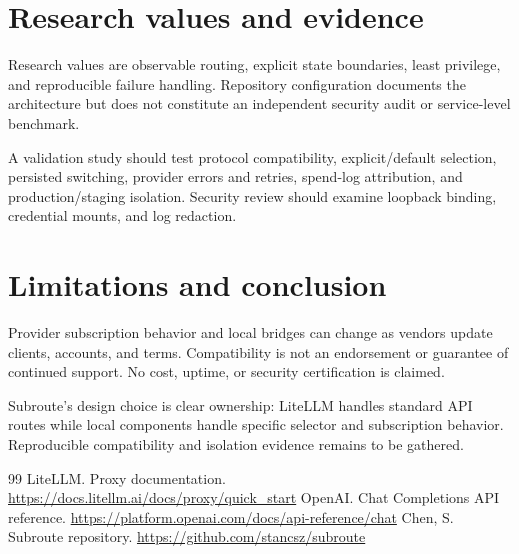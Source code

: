 \documentclass[11pt]{article}
\begin{document}
\section{Research values and evidence}
Research values are observable routing, explicit state boundaries, least privilege, and reproducible failure handling. Repository configuration documents the architecture but does not constitute an independent security audit or service-level benchmark.\par
A validation study should test protocol compatibility, explicit/default selection, persisted switching, provider errors and retries, spend-log attribution, and production/staging isolation. Security review should examine loopback binding, credential mounts, and log redaction.\par
\section{Limitations and conclusion}
Provider subscription behavior and local bridges can change as vendors update clients, accounts, and terms. Compatibility is not an endorsement or guarantee of continued support. No cost, uptime, or security certification is claimed.\par
Subroute's design choice is clear ownership: LiteLLM handles standard API routes while local components handle specific selector and subscription behavior. Reproducible compatibility and isolation evidence remains to be gathered.\par
\begin{thebibliography}{99}
 LiteLLM. Proxy documentation. \url{https://docs.litellm.ai/docs/proxy/quick_start}
 OpenAI. Chat Completions API reference. \url{https://platform.openai.com/docs/api-reference/chat}
 Chen, S. Subroute repository. \url{https://github.com/stancsz/subroute}
\end{thebibliography}
\end{document}
